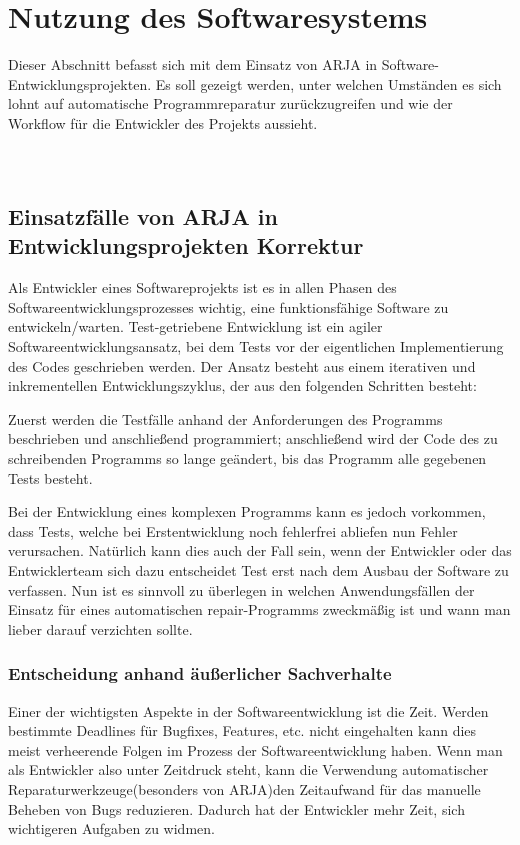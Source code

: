 \documentclass[11pt,a4paper]{article}
\begin{document}
\section{Nutzung des Softwaresystems}
Dieser Abschnitt befasst sich mit dem Einsatz von ARJA in Software-Entwicklungsprojekten. Es soll gezeigt werden, unter welchen Umständen
es sich lohnt auf automatische Programmreparatur zurückzugreifen und wie der Workflow für die Entwickler des Projekts aussieht.
\\ \\ \\ \subsection{Einsatzfälle von ARJA in Entwicklungsprojekten Korrektur}
Als Entwickler eines Softwareprojekts ist es in allen Phasen des Softwareentwicklungsprozesses wichtig, eine funktionsfähige Software zu entwickeln/warten.
Test-getriebene Entwicklung ist ein agiler Softwareentwicklungsansatz, bei dem Tests vor der eigentlichen Implementierung des Codes geschrieben werden. Der Ansatz besteht aus einem iterativen und inkrementellen Entwicklungszyklus, der aus den folgenden Schritten besteht:

Zuerst werden die Testfälle anhand der Anforderungen des Programms beschrieben und anschließend programmiert; anschließend wird der Code des zu schreibenden Programms so lange geändert, bis das Programm alle gegebenen Tests besteht.

Bei der Entwicklung eines komplexen Programms kann es jedoch vorkommen, dass Tests, welche bei Erstentwicklung noch fehlerfrei abliefen nun Fehler verursachen. Natürlich kann dies auch der Fall sein, wenn der Entwickler oder das Entwicklerteam sich dazu entscheidet Test erst nach dem Ausbau der Software zu verfassen. Nun ist es sinnvoll zu überlegen in welchen Anwendungsfällen der Einsatz für eines automatischen repair-Programms zweckmäßig ist und wann man lieber darauf verzichten sollte.

\subsubsection{Entscheidung anhand äußerlicher Sachverhalte}

Einer der wichtigsten Aspekte in der Softwareentwicklung ist die Zeit. Werden bestimmte Deadlines für Bugfixes, Features, etc. nicht eingehalten kann dies meist verheerende Folgen im Prozess der Softwareentwicklung haben. Wenn man als Entwickler also unter Zeitdruck steht, kann die Verwendung automatischer Reparaturwerkzeuge(besonders von ARJA)den Zeitaufwand für das manuelle Beheben von Bugs reduzieren. Dadurch hat der Entwickler mehr Zeit, sich wichtigeren Aufgaben zu widmen.
\end{document}
